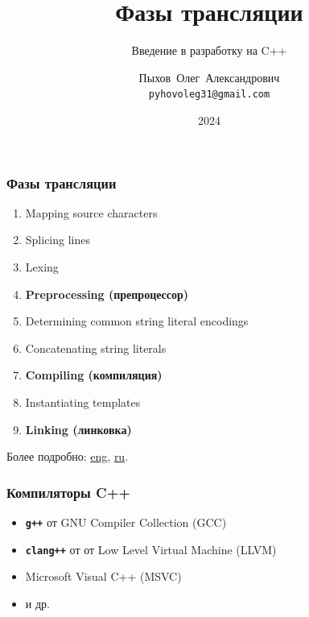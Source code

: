 \documentclass[compress]{beamer}
\subtitle{Введение в разработку на C++}
\author{Пыхов~Олег~Александрович \\ \texttt{pyhovoleg31@gmail.com}}
\institute{
    ООО~"Прософт-Системы"
}
\date{2024}
\title{Фазы трансляции}
\begin{document}
\frame[plain]{\titlepage}

\begin{frame}

    \frametitle{Фазы трансляции}

    \begin{enumerate}

        \item Mapping source characters

        \item Splicing lines

        \item Lexing

        \item \textbf{Preprocessing (препроцессор)}

        \item Determining common string literal encodings

        \item Concatenating string literals

        \item \textbf{Compiling (компиляция)}

        \item Instantiating templates

        \item \textbf{Linking (линковка)}

    \end{enumerate}

    \vfill

    Более подробно:
    \href{https://en.cppreference.com/w/cpp/language/translation_phases}{eng},
    \href{https://ru.cppreference.com/w/cpp/language/translation_phases}{ru}.

\end{frame}

\begin{frame}

    \frametitle{Компиляторы C++}

    \begin{itemize}

        \item \texttt{\textbf{g++}} от GNU Compiler Collection (GCC)

        \item \texttt{\textbf{clang++}} от от Low Level Virtual Machine (LLVM)

        \item Microsoft Visual C++ (MSVC)

        \item и др.

    \end{itemize}

\end{frame}
\end{document}
